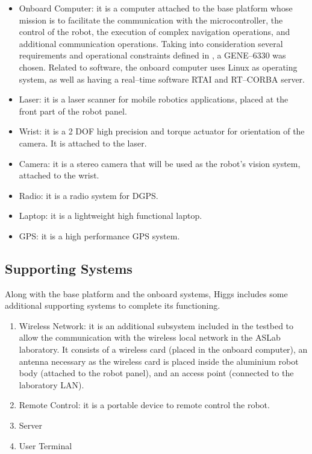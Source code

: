\begin{itemize}
\item Onboard Computer:  it is a computer attached to the base platform whose mission is to facilitate the communication with the microcontroller, the control of the robot, the execution of complex navigation operations, and additional communication operations. Taking into consideration several requirements and operational constraints defined in \cite{ManualHiggs}, a GENE--6330 was chosen. Related to software, the onboard computer uses Linux as operating system, as well as having a real--time software RTAI and RT--CORBA server.
\item Laser: it is a laser scanner for mobile robotics applications, placed at the front part of the robot panel.
\item Wrist: it is a 2 DOF high precision and torque actuator for orientation of the camera. It is attached to the laser.
\item Camera: it is a stereo camera that will be used as the robot's vision system, attached to the wrist.
\item Radio: it is a radio system for DGPS.
\item Laptop: it is a lightweight high functional laptop.
\item GPS: it is a high performance GPS system.
\end{itemize}

\subsection{Supporting Systems} 
Along with the base platform and the onboard systems, Higgs includes some
additional supporting systems to complete its functioning.

\begin{enumerate}
\item Wireless Network: it is an additional subsystem included in the testbed to allow the communication with the wireless local network in the ASLab laboratory. It consists of a wireless card (placed in the onboard computer), an antenna necessary as the wireless card is placed inside the aluminium robot body (attached to the robot panel), and an access point (connected to the laboratory LAN).
\item Remote Control: it is a portable device to remote control the robot.
\item Server
\item User Terminal
\end{enumerate}

